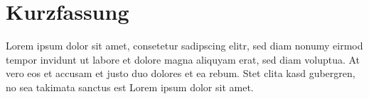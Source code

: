 \chapter*{Kurzfassung}


Lorem ipsum dolor sit amet, consetetur sadipscing elitr, sed diam nonumy eirmod tempor invidunt ut labore et dolore magna aliquyam erat, sed diam voluptua. At vero eos et accusam et justo duo dolores  et ea rebum. Stet clita kasd gubergren, no sea takimata sanctus est Lorem ipsum dolor sit amet.